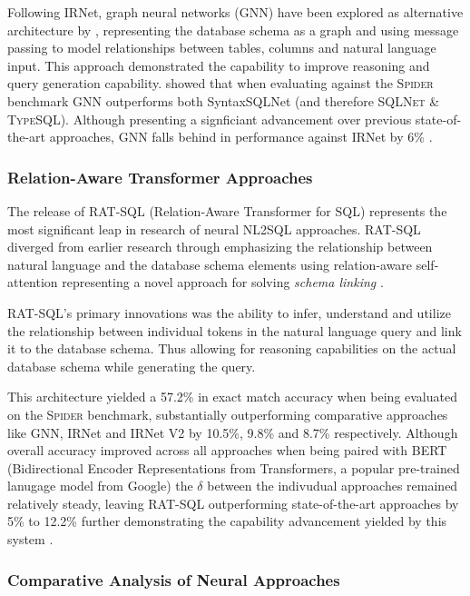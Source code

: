 \documentclass{article}
\begin{document}
Following IRNet, graph neural networks (GNN) have been explored as alternative architecture by \cite{GNN}, representing the
database schema as a graph and using message passing to model relationships between tables, columns and natural language input.
This approach demonstrated the capability to improve reasoning and query generation capability. \citeauthor{GNN} showed that when 
evaluating against the \textsc{Spider} benchmark GNN outperforms both SyntaxSQLNet (and therefore \textsc{SQLNet} \&
\textsc{TypeSQL}). Although presenting a signficiant advancement over previous state-of-the-art approaches, GNN falls behind in
performance against IRNet by 6\% \citep{IRNet, GNN}.

\subsubsection{Relation-Aware Transformer Approaches}

The release of RAT-SQL (Relation-Aware Transformer for SQL) \cite{RATSQL} represents the most significant leap in research of
neural NL2SQL approaches. RAT-SQL diverged from earlier research through emphasizing the relationship between natural language
and the database schema elements using relation-aware self-attention representing a novel approach for solving \textit{schema 
linking} \citep{RATSQL}.

RAT-SQL's primary innovations was the ability to infer, understand and utilize the relationship between individual tokens in the 
natural language query and link it to the database schema. Thus allowing for reasoning capabilities on the actual database schema
while generating the query.

This architecture yielded a 57.2\% in exact match accuracy when being evaluated on the \textsc{Spider} benchmark, substantially
outperforming comparative approaches like GNN, IRNet and IRNet V2 by 10.5\%, 9.8\% and 8.7\% respectively. Although overall
accuracy improved across all approaches when being paired with BERT (Bidirectional Encoder Representations from Transformers, a 
popular pre-trained lanugage model from Google) the $\delta$ between the indivudual approaches remained relatively steady, leaving
RAT-SQL outperforming state-of-the-art approaches by 5\% to 12.2\% further demonstrating the capability advancement yielded by this 
system \citep{RATSQL}.

\subsubsection{Comparative Analysis of Neural Approaches}
\end{document}
